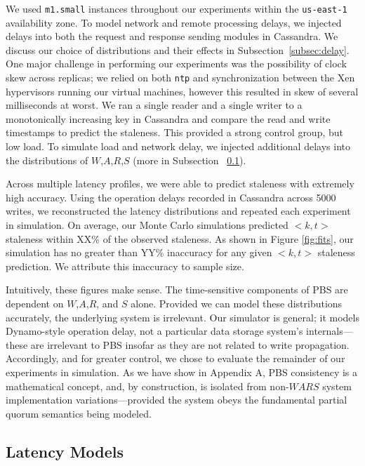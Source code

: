 \documentclass{vldb}
\begin{document}
We used \texttt{m1.small} instances throughout our experiments within
the \texttt{us-east-1} availability zone.  To model network and remote
processing delays, we injected delays into both the request and
response sending modules in Cassandra.  We discuss our choice of
distributions and their effects in Subsection~\ref{subsec:delay}.  One
major challenge in performing our experiments was the possibility of
clock skew across replicas; we relied on both \texttt{ntp} and
synchronization between the Xen hypervisors running our virtual
machines, however this resulted in skew of several milliseconds at
worst.  We ran a single reader and a single writer to a monotonically
increasing key in Cassandra and compare the read and write timestamps
to predict the staleness.  This provided a strong control group, but
low load.  To simulate load and network delay, we injected additional
delays into the distributions of $W$,$A$,$R$,$S$ (more in Subsection
~\ref{sec:latencies}).

Across multiple latency profiles, we were able to predict staleness
with extremely high accuracy.  Using the operation delays recorded in
Cassandra across 5000 writes, we reconstructed the latency
distributions and repeated each experiment in simulation.  On average,
our Monte Carlo simulations predicted $<k,t>$ staleness within XX\% of
the observed staleness.  As shown in Figure \ref{fig:fits}, our
simulation has no greater than YY\% inaccuracy for any given $<k,t>$
staleness prediction.  We attribute this inaccuracy to sample size.

Intuitively, these figures make sense.  The time-sensitive components
of PBS are dependent on $W$,$A$,$R$, and $S$ alone.  Provided we can
model these distributions accurately, the underlying system is
irrelevant.  Our simulator is general; it models Dynamo-style
operation delay, not a particular data storage system's
internals---these are irrelevant to PBS insofar as they are not
related to write propagation.  Accordingly, and for greater control,
we chose to evaluate the remainder of our experiments in simulation.
As we have show in Appendix A, PBS consistency is a mathematical
concept, and, by construction, is isolated from non-$WARS$ system
implementation variations---provided the system obeys the fundamental
partial quorum semantics being modeled.

\subsection{Latency Models}
\label{sec:latencies}
\end{document}

